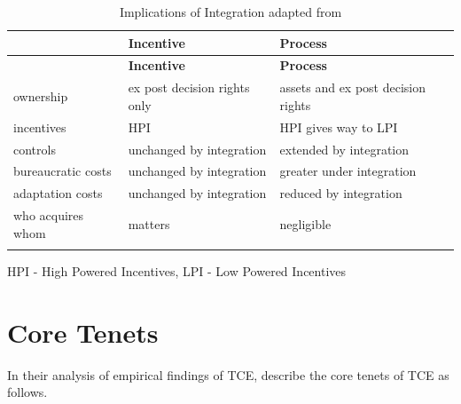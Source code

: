 \documentclass[12pt]{article}
\begin{document}
\begin{center}
\begin{longtable}{|p{}|p{}|p{}|}
\hline&\textbf{Incentive}&\textbf{Process}\\\hline
\endfirsthead
\hline&\textbf{Incentive}&\textbf{Process}\\\hline
\endhead

ownership&ex post decision rights only&assets and ex post decision rights\\\hline
incentives&HPI&HPI gives way to LPI\\\hline
controls&unchanged by integration&extended by integration\\\hline
bureaucratic costs&unchanged by integration&greater under integration\\\hline
adaptation costs&unchanged by integration&reduced by integration\\\hline
who acquires whom&matters&negligible\\\hline

\caption {Implications of Integration adapted from \cite{Williamson1988}}
\label{table:IntegrationEntails}\\
\end{longtable}
\end{center}
HPI - High Powered Incentives, LPI - Low Powered Incentives

\section{Core Tenets}
In their analysis of empirical findings of TCE, \cite{David2004} describe the core tenets of TCE as follows.
\end{document}
